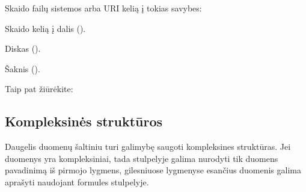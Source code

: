 \documentclass[letterpaper,10pt,lithuanian]{sphinxmanual}
\begin{document}
\begin{fulllineitems}
\begin{fulllineitems}
\label{\detokenize{formules:path}}
\pysigstartsignatures
\pysiglinewithargsret
{}
{}
{}
\pysigstopsignatures
\sphinxAtStartPar
Skaido failų sistemos arba URI kelią į tokias savybes:
\begin{description}
\sphinxAtStartPar
Skaido kelią į dalis ().

\sphinxAtStartPar
Diskas ().

\sphinxAtStartPar
Šaknis ().

\end{description}


\begin{sphinxseealso}{Taip pat žiūrėkite:}

\begin{DUlineblock}{0em}
\item[] {\hyperref[\detokenize{dimensijos:param.path}]{}}
\end{DUlineblock}


\end{sphinxseealso}


\end{fulllineitems}


\end{fulllineitems}



\subsection{Kompleksinės struktūros}
\label{\detokenize{formules:kompleksines-strukturos}}\label{\detokenize{formules:id20}}
\sphinxAtStartPar
Daugelis duomenų šaltiniu turi galimybę saugoti kompleksines struktūras. Jei
duomenys yra kompleksiniai, tada {\hyperref[\detokenize{dimensijos:property.source}]{}} stulpelyje galima
nurodyti tik duomens pavadinimą iš pirmojo lygmens, gilesniuose lygmenyse
esančius duomenis galima aprašyti naudojant formules {\hyperref[\detokenize{dimensijos:property.prepare}]{}}
stulpelyje.
\end{document}
